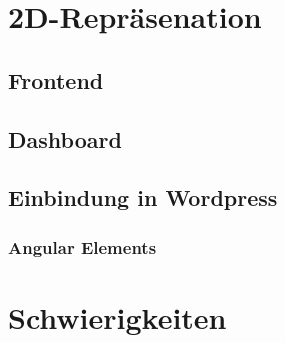 \section{2D-Repräsenation}

\subsection{Frontend}

\subsection{Dashboard}

\subsection{Einbindung in Wordpress}
\subsubsection{Angular Elements}

\section{Schwierigkeiten}
